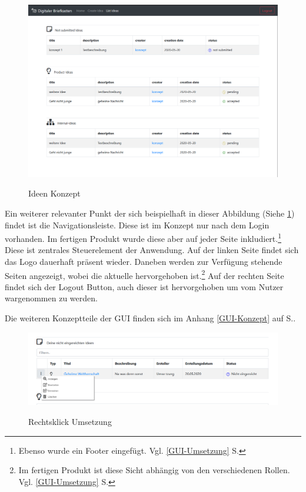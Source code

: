 \begin{figure}[hbt]
\centering
\begin{minipage}[t]{1\textwidth}
    \caption{Ideen Konzept}
    \includegraphics[width=1\textwidth]{img/ideen-konzept.png}\\
    \label{fig:ideen}
\end{minipage}
\end{figure}

Ein weiterer relevanter Punkt der sich beispielhaft in dieser Abbildung (Siehe \cref{fig:ideen}) findet ist die Navigationsleiste. Diese ist im Konzept nur nach dem Login vorhanden. Im fertigen Produkt wurde diese aber auf jeder Seite inkludiert.\footnote{Ebenso wurde ein Footer eingefügt. Vgl. \ref{GUI-Umsetzung} S.\pageref{GUI-Umsetzung}}
Diese ist zentrales Steuerelement der Anwendung. Auf der linken Seite findet sich das Logo dauerhaft präsent wieder. Daneben werden zur Verfügung stehende Seiten angezeigt, wobei die aktuelle hervorgehoben ist.\footnote{Im fertigen Produkt ist diese Sicht abhängig von den verschiedenen Rollen. Vgl. \ref{GUI-Umsetzung} S.\pageref{GUI-Umsetzung}} Auf der rechten Seite findet sich der Logout Button, auch dieser ist hervorgehoben um vom Nutzer wargenommen zu werden.

Die weiteren Konzeptteile der GUI finden sich im Anhang \ref{GUI-Konzept} auf S.\pageref{GUI-Konzept}.

\begin{figure}[hbt]
\centering
\begin{minipage}[t]{1\textwidth}
    \caption{Rechtsklick Umsetzung}
    \includegraphics[width=1\textwidth]{img/rechtsklick-umsetzung.png}\\
    \label{fig:rechtsklick}
\end{minipage}
\end{figure}

